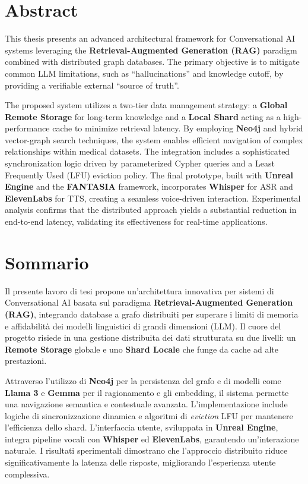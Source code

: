 \chapter*{Abstract}

This thesis presents an advanced architectural framework for Conversational AI systems leveraging the \textbf{Retrieval-Augmented Generation (RAG)} paradigm combined with distributed graph databases. The primary objective is to mitigate common LLM limitations, such as ``hallucinations'' and knowledge cutoff, by providing a verifiable external ``source of truth''.

The proposed system utilizes a two-tier data management strategy: a \textbf{Global Remote Storage} for long-term knowledge and a \textbf{Local Shard} acting as a high-performance cache to minimize retrieval latency. By employing \textbf{Neo4j} and hybrid vector-graph search techniques, the system enables efficient navigation of complex relationships within medical datasets. The integration includes a sophisticated synchronization logic driven by parameterized Cypher queries and a Least Frequently Used (LFU) eviction policy. The final prototype, built with \textbf{Unreal Engine} and the \textbf{FANTASIA} framework, incorporates \textbf{Whisper} for ASR and \textbf{ElevenLabs} for TTS, creating a seamless voice-driven interaction. Experimental analysis confirms that the distributed approach yields a substantial reduction in end-to-end latency, validating its effectiveness for real-time applications.

\chapter*{Sommario}

Il presente lavoro di tesi propone un’architettura innovativa per sistemi di Conversational AI basata sul paradigma \textbf{Retrieval-Augmented Generation (RAG)}, integrando database a grafo distribuiti per superare i limiti di memoria e affidabilità dei modelli linguistici di grandi dimensioni (LLM). Il cuore del progetto risiede in una gestione distribuita dei dati strutturata su due livelli: un \textbf{Remote Storage} globale e uno \textbf{Shard Locale} che funge da cache ad alte prestazioni.

Attraverso l’utilizzo di \textbf{Neo4j} per la persistenza del grafo e di modelli come \textbf{Llama 3} e \textbf{Gemma} per il ragionamento e gli embedding, il sistema permette una navigazione semantica e contestuale avanzata. L’implementazione include logiche di sincronizzazione dinamica e algoritmi di \textit{eviction} LFU per mantenere l’efficienza dello shard. L’interfaccia utente, sviluppata in \textbf{Unreal Engine}, integra pipeline vocali con \textbf{Whisper} ed \textbf{ElevenLabs}, garantendo un'interazione naturale. I risultati sperimentali dimostrano che l'approccio distribuito riduce significativamente la latenza delle risposte, migliorando l'esperienza utente complessiva.